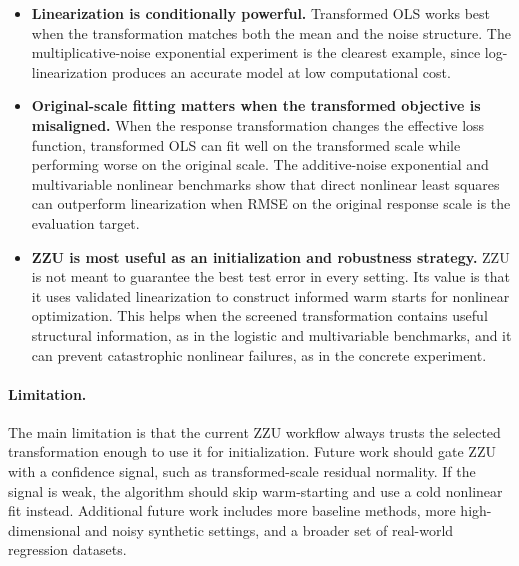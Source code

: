 \documentclass[11pt]{article}
\begin{document}
\begin{itemize}
    \item \textbf{Linearization is conditionally powerful.} Transformed OLS works best when the transformation matches both the mean and the noise structure. The multiplicative-noise exponential experiment is the clearest example, since log-linearization produces an accurate model at low computational cost.

    \item \textbf{Original-scale fitting matters when the transformed objective is misaligned.} When the response transformation changes the effective loss function, transformed OLS can fit well on the transformed scale while performing worse on the original scale. The additive-noise exponential and multivariable nonlinear benchmarks show that direct nonlinear least squares can outperform linearization when RMSE on the original response scale is the evaluation target.

    \item \textbf{ZZU is most useful as an initialization and robustness strategy.} ZZU is not meant to guarantee the best test error in every setting. Its value is that it uses validated linearization to construct informed warm starts for nonlinear optimization. This helps when the screened transformation contains useful structural information, as in the logistic and multivariable benchmarks, and it can prevent catastrophic nonlinear failures, as in the concrete experiment.
\end{itemize}

\paragraph{Limitation.} The main limitation is that the current ZZU workflow always trusts the selected transformation enough to use it for initialization. Future work should gate ZZU with a confidence signal, such as transformed-scale residual normality. If the signal is weak, the algorithm should skip warm-starting and use a cold nonlinear fit instead. Additional future work includes more baseline methods, more high-dimensional and noisy synthetic settings, and a broader set of real-world regression datasets.
\end{document}
